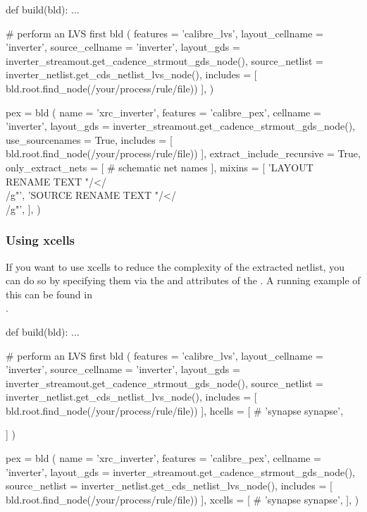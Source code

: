 \begin{lstwscript}
def build(bld):
    ...

    # perform an LVS first
    bld (
        features = 'calibre_lvs',
        layout_cellname = 'inverter',
        source_cellname = 'inverter',
        layout_gds = inverter_streamout.get_cadence_strmout_gds_node(),
        source_netlist = inverter_netlist.get_cds_netlist_lvs_node(),
        includes = [
            bld.root.find_node(/your/process/rule/file))
        ],
    )

    pex = bld (
        name = 'xrc_inverter',
        features = 'calibre_pex',
        cellname = 'inverter',
        layout_gds = inverter_streamout.get_cadence_strmout_gds_node(),
        use_sourcenames = True,
        includes = [
            bld.root.find_node(/your/process/rule/file))
        ],
        extract_include_recursive = True,
        only_extract_nets = [
            # schematic net names
        ],
        mixins = [
            'LAYOUT RENAME TEXT "/</\\[/g" "/>/\\]/g"',
            'SOURCE RENAME TEXT "/</\\[/g" "/>/\\]/g"',
        ],
    )
\end{lstwscript}
\subsubsection{Using xcells}
If you want to use xcells to reduce the complexity of the extracted netlist,
you can do so by specifying them via the  and  attributes
of the .
A running example of this can be found in\\
.

\begin{lstwscript}
def build(bld):
    ...

    # perform an LVS first
    bld (
        features = 'calibre_lvs',
        layout_cellname = 'inverter',
        source_cellname = 'inverter',
        layout_gds = inverter_streamout.get_cadence_strmout_gds_node(),
        source_netlist = inverter_netlist.get_cds_netlist_lvs_node(),
        includes = [
            bld.root.find_node(/your/process/rule/file))
        ],
        hcells = [
            #        'synapse synapse',

        ]
    )

    pex = bld (
        name = 'xrc_inverter',
        features = 'calibre_pex',
        cellname = 'inverter',
        layout_gds = inverter_streamout.get_cadence_strmout_gds_node(),
        source_netlist = inverter_netlist.get_cds_netlist_lvs_node(),
        includes = [
            bld.root.find_node(/your/process/rule/file))
        ],
        xcells = [
            #        'synapse synapse',
        ],
    )
\end{lstwscript}

